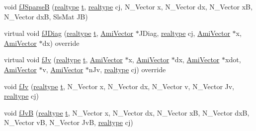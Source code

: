 \begin{DoxyCompactItemize}
\item 
void \mbox{\hyperlink{classamici_1_1_model___d_a_e_a389bccc94cc77a18cc1948d592ca7fca}{f\+J\+SparseB}} (\mbox{\hyperlink{namespaceamici_a1bdce28051d6a53868f7ccbf5f2c14a3}{realtype}} \mbox{\hyperlink{classamici_1_1_model_a711281d57e9710226face29151cc4641}{t}}, \mbox{\hyperlink{namespaceamici_a1bdce28051d6a53868f7ccbf5f2c14a3}{realtype}} cj, N\+\_\+\+Vector x, N\+\_\+\+Vector dx, N\+\_\+\+Vector xB, N\+\_\+\+Vector dxB, Sls\+Mat JB)
\item 
virtual void \mbox{\hyperlink{classamici_1_1_model___d_a_e_a58cf5aaa5fbcf6195407e7651f05c218}{f\+J\+Diag}} (\mbox{\hyperlink{namespaceamici_a1bdce28051d6a53868f7ccbf5f2c14a3}{realtype}} \mbox{\hyperlink{classamici_1_1_model_a711281d57e9710226face29151cc4641}{t}}, \mbox{\hyperlink{classamici_1_1_ami_vector}{Ami\+Vector}} $\ast$J\+Diag, \mbox{\hyperlink{namespaceamici_a1bdce28051d6a53868f7ccbf5f2c14a3}{realtype}} cj, \mbox{\hyperlink{classamici_1_1_ami_vector}{Ami\+Vector}} $\ast$x, \mbox{\hyperlink{classamici_1_1_ami_vector}{Ami\+Vector}} $\ast$dx) override
\item 
virtual void \mbox{\hyperlink{classamici_1_1_model___d_a_e_a1a0549510cbe20e4d3c28bf77fc722ed}{f\+Jv}} (\mbox{\hyperlink{namespaceamici_a1bdce28051d6a53868f7ccbf5f2c14a3}{realtype}} \mbox{\hyperlink{classamici_1_1_model_a711281d57e9710226face29151cc4641}{t}}, \mbox{\hyperlink{classamici_1_1_ami_vector}{Ami\+Vector}} $\ast$x, \mbox{\hyperlink{classamici_1_1_ami_vector}{Ami\+Vector}} $\ast$dx, \mbox{\hyperlink{classamici_1_1_ami_vector}{Ami\+Vector}} $\ast$xdot, \mbox{\hyperlink{classamici_1_1_ami_vector}{Ami\+Vector}} $\ast$v, \mbox{\hyperlink{classamici_1_1_ami_vector}{Ami\+Vector}} $\ast$n\+Jv, \mbox{\hyperlink{namespaceamici_a1bdce28051d6a53868f7ccbf5f2c14a3}{realtype}} cj) override
\item 
void \mbox{\hyperlink{classamici_1_1_model___d_a_e_a7a3565abc7cb0372df38aec43e764275}{f\+Jv}} (\mbox{\hyperlink{namespaceamici_a1bdce28051d6a53868f7ccbf5f2c14a3}{realtype}} \mbox{\hyperlink{classamici_1_1_model_a711281d57e9710226face29151cc4641}{t}}, N\+\_\+\+Vector x, N\+\_\+\+Vector dx, N\+\_\+\+Vector v, N\+\_\+\+Vector Jv, \mbox{\hyperlink{namespaceamici_a1bdce28051d6a53868f7ccbf5f2c14a3}{realtype}} cj)
\item 
void \mbox{\hyperlink{classamici_1_1_model___d_a_e_a837e1b2b4f0e13b64180040a9cb8e6b2}{f\+JvB}} (\mbox{\hyperlink{namespaceamici_a1bdce28051d6a53868f7ccbf5f2c14a3}{realtype}} \mbox{\hyperlink{classamici_1_1_model_a711281d57e9710226face29151cc4641}{t}}, N\+\_\+\+Vector x, N\+\_\+\+Vector dx, N\+\_\+\+Vector xB, N\+\_\+\+Vector dxB, N\+\_\+\+Vector vB, N\+\_\+\+Vector JvB, \mbox{\hyperlink{namespaceamici_a1bdce28051d6a53868f7ccbf5f2c14a3}{realtype}} cj)

\end{DoxyCompactItemize}
